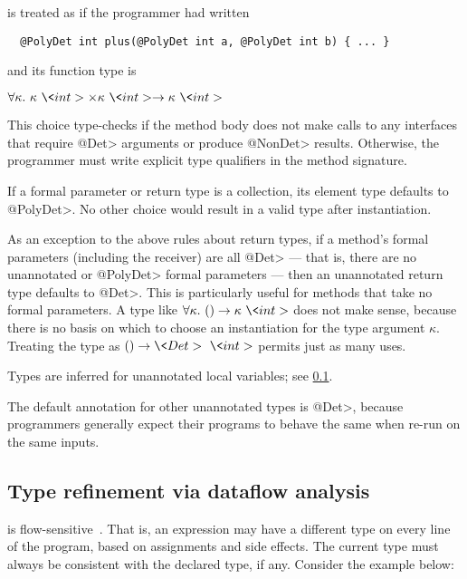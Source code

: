 \noindent
is treated as if the programmer had written

\begin{Verbatim}
  @PolyDet int plus(@PolyDet int a, @PolyDet int b) { ... }
\end{Verbatim}

\noindent
and its function type is

$\forallt{\kappa}  \kappa\ \<int> \times \kappa\ \<int> \rightarrow \kappa\ \<int>$

\noindent
This choice type-checks if the method body does not make calls to any
interfaces that require \<@Det> arguments or produce \<@NonDet> results.
Otherwise, the programmer must write explicit type qualifiers in the method
signature.

If a formal parameter or return type is a collection, its element type
defaults to \<@PolyDet>.  No other choice would result in a valid type
after instantiation.

As an exception to the above rules about return types, if a method's formal
parameters (including the receiver) are all \<@Det> --- that is, there are
no unannotated or \<@PolyDet> formal parameters --- then an unannotated
return type defaults to \<@Det>.  This is particularly useful for methods
that take no formal parameters.  A type like $\forallt{\kappa} ()
\rightarrow \kappa\ \<int>$ does not make sense, because there is no basis
on which to choose an
instantiation for the type argument $\kappa$.  Treating the type as $()
\rightarrow \<Det>\ \<int>$ permits just as many uses.

Types are inferred for unannotated local variables; see \cref{sec:dataflow-java}.

The default annotation for other unannotated types is \<@Det>, because
programmers generally expect their programs to behave the same when re-run
on the same inputs.



\subsection{Type refinement via dataflow analysis}\label{sec:dataflow-java}

\OurTypeSystem is
flow-sensitive~\cite{Hunt:2006:FST:1111037.1111045,Adams:2011:FTR:2048066.2048105,Sui:2016:OSU:2950290.2950296}.
That is, an expression may have
a different type on every line of the program, based on assignments and
side effects.  The current type must always be consistent with the declared
type, if any.
Consider the example below:

